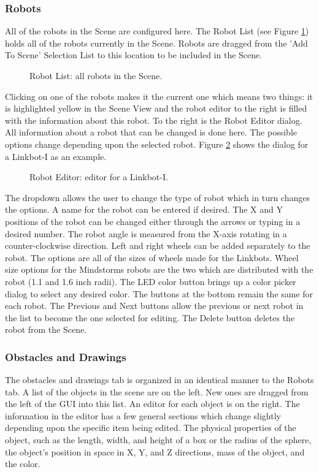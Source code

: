 \documentclass{article}
\begin{document}
\subsubsection{Robots}
All  of the robots in the Scene are configured here.  The Robot List
(see Figure \ref{fig:robot_list}) holds all of the robots currently in the
Scene.  Robots are dragged from the 'Add To Scene' Selection List to this
location to be included in the Scene.
\begin{figure}[H]
	\begin{center}
	\end{center}
	\caption{Robot List: all robots in the Scene.}
	\label{fig:robot_list}
\end{figure}
Clicking on one of the robots makes it the current one which means two things:
it is highlighted yellow in the Scene View and the robot editor to the right is
filled with the information about this robot.  To the right is the Robot Editor
dialog.  All information about a robot that can be changed is done here.  The
possible options change depending upon the selected robot.  Figure
\ref{fig:editorI} shows the dialog for a Linkbot-I as an example.
\begin{figure}[H]
	\begin{center}
	\end{center}
	\caption{Robot Editor: editor for a Linkbot-I.}
	\label{fig:editorI}
\end{figure}
The dropdown allows the user to change the type of robot which in turn changes
the options.  A name for the robot can be entered if desired.  The X and Y
positions of the robot can be changed either through the arrows or typing in a
desired number.  The robot angle is measured from the X-axis rotating in a
counter-clockwise direction.  Left and right wheels can be added separately to
the robot.  The options are all of the sizes of wheels made for the Linkbots.
Wheel size options for the Mindstorms robots are the two which are distributed
with the robot (1.1 and 1.6 inch radii).  The LED color button brings up a color
picker dialog to select any desired color.  The buttons at the bottom remain the
same for each robot.  The Previous and Next buttons allow the previous or next
robot in the list to become the one selected for editing.  The Delete button
deletes the robot from the Scene.

\subsubsection{Obstacles and Drawings}
The obstacles and drawings tab is organized in an
identical manner to the Robots tab.  A list of the objects in the scene are on
the left.  New ones are dragged from the left of the GUI into this list.  An
editor for each object is on the right.  The information in the editor has a
few general sections which change slightly depending upon the specific item
being edited.  The physical properties of the object, such as the length,
width, and height of a box or the radius of the sphere, the object's position
in space in X, Y, and Z directions, mass of the object, and the color.
\end{document}
